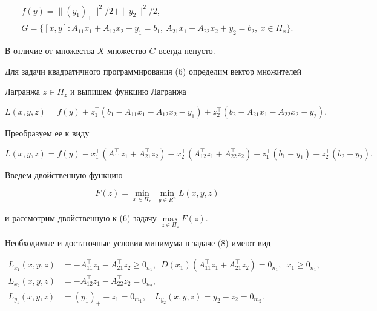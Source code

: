 \begin{gather*}


f(y)=\|(y_1)_+\|^2/2+\|y_2\|^2/2,\\


G=\{[x,y]:A_{11}x_1+A_{12}x_2+y_1=b_1,


\ A_{21}x_1+A_{22}x_2+y_2=b_2,\ x\in\Pi_x\}.


\end{gather*}





В отличие от множества $X$ множество $G$ всегда непусто.





Для задачи квадратичного программирования (6) определим вектор множителей


Лагранжа $z\in\Pi_z$ и выпишем функцию Лагранжа


$$


L(x,y,z)=f(y)+z^\top_1(b_1-A_{11}x_1-A_{12}x_2-y_1)+


z^\top_2(b_2-A_{21}x_1-A_{22}x_2-y_2).


$$


Преобразуем ее к виду


\begin{equation}


L(x,y,z)=f(y)-x^\top_1(A^\top_{11}z_1+A^\top_{21}z_2)-


x^\top_2(A^\top_{12}z_1+A^\top_{22}z_2)+


z^\top_1(b_1-y_1)+z^\top_2(b_2-y_2).


\end{equation}





Введем двойственную функцию


\begin{equation}


F(z)=\min_{x\in\Pi_x}\; \min_{y\in R^n}L(x,y,z)


\end{equation}


и рассмотрим двойственную к (6) задачу $\max\limits_{z\in\Pi_z}F(z)$.





Необходимые и достаточные условия минимума в задаче (8) имеют вид


\begin{align}


L_{x_1}(x,y,z)&=-A^\top_{11}z_1-A^\top_{21}z_2\ge0_{n_1},\ \;


D(x_1)(A^\top_{11}z_1+A^\top_{21}z_2)=0_{n_1},\ \; x_1\ge0_{n_1},\\


%


L_{x_2}(x,y,z)&=-A^\top_{12}z_1-A^\top_{22}z_2=0_{n_2},\\


%


L_{y_1}(x,y,z)&=(y_1)_+-z_1=0_{m_1},\quad


L_{y_2}(x,y,z)=y_2-z_2=0_{m_2}.


\end{align}


